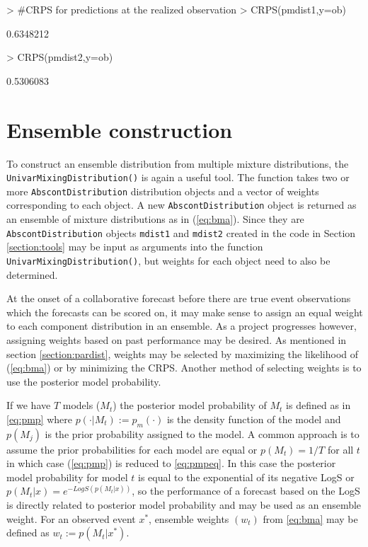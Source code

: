 \documentclass[11pt,notitlepage]{isuthesis}
\begin{document}
\begin{Schunk}
\begin{Sinput}
> #CRPS for predictions at the realized observation
> CRPS(pmdist1,y=ob)
\end{Sinput}
\begin{Soutput}
[1] 0.6348212
\end{Soutput}
\begin{Sinput}
> CRPS(pmdist2,y=ob)
\end{Sinput}
\begin{Soutput}
[1] 0.5306083
\end{Soutput}
\end{Schunk}

\section{Ensemble construction}
\label{section:enscon}


To construct an ensemble distribution from multiple mixture distributions, the 
\texttt{UnivarMixingDistribution()} is again a useful tool. The function takes 
two or more
\texttt{AbscontDistribution} distribution objects and a vector of weights 
corresponding to each object. A new \texttt{AbscontDistribution} object is 
returned as an ensemble of mixture distributions as in (\ref{eq:bma}). 
Since they are \texttt{AbscontDistribution} objects \texttt{mdist1} and 
\texttt{mdist2} created in the code
in Section \ref{section:tools} may be input as arguments into the function
\texttt{UnivarMixingDistribution()}, but weights for each object need to also
be determined.

At the onset of a collaborative forecast before there are true event 
observations which the forecasts can be scored on, 
it may make sense to assign an equal weight to each 
component distribution in an ensemble. As a project progresses however, 
assigning weights based on past performance may be desired. As mentioned in 
section \ref{section:pardist}, weights may be selected by maximizing the
likelihood of (\ref{eq:bma}) or by minimizing the CRPS. Another method of 
selecting weights is to use the posterior model probability. 

If we have $T$ models ($M_t$) the posterior model probability of $M_t$ is 
defined as in \eqref{eq:pmp} where $p(\cdot |M_t) := p_m(\cdot)$ is the density 
function of the model and 
$p(M_j)$ is the prior probability assigned to the model. A common approach is to
assume the prior
probabilities for each model are equal or $p(M_t) = 1/T$ for all $t$ in which 
case
(\ref{eq:pmp}) is reduced to \eqref{eq:pmpeq}. In this case the posterior model 
probability for model $t$ is equal to the exponential of its negative LogS or
$p(M_t|x) = e^{-LogS(p(M_t|x))}$, so the performance of a forecast based on the
LogS is directly related to posterior model probability and may be used as an 
ensemble weight. For an observed event $x^*$, ensemble weights $(w_t)$ from 
\eqref{eq:bma} may be defined as $w_t := p(M_t|x^*)$.
\end{document}
